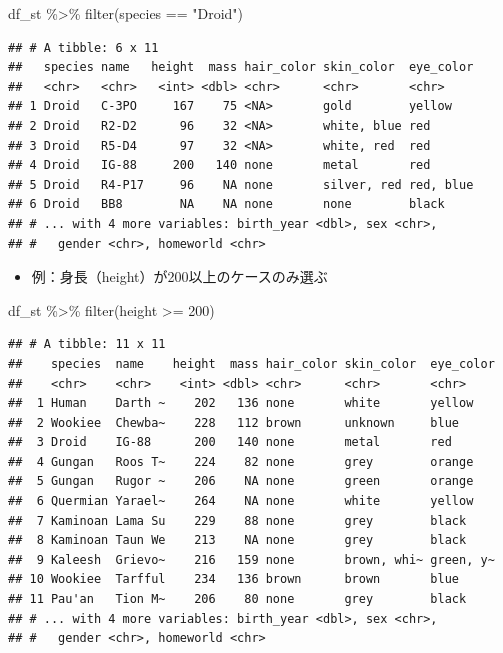 \documentclass[
  xelatex,ja=standard, b5paper]{bxjsbook}
\newenvironment{Shaded}{\begin{snugshade}}{\end{snugshade}}
\newcommand{\DecValTok}[1]{\textcolor[rgb]{0.00,0.00,0.81}{#1}}
\newcommand{\FunctionTok}[1]{\textcolor[rgb]{0.00,0.00,0.00}{#1}}
\newcommand{\NormalTok}[1]{#1}
\newcommand{\SpecialCharTok}[1]{\textcolor[rgb]{0.00,0.00,0.00}{#1}}
\newcommand{\StringTok}[1]{\textcolor[rgb]{0.31,0.60,0.02}{#1}}
\providecommand{\tightlist}{%
  \setlength{\itemsep}{0pt}\setlength{\parskip}{0pt}}
\begin{document}
\begin{Shaded}
\begin{Highlighting}[]
\NormalTok{df\_st }\SpecialCharTok{\%\textgreater{}\%} 
  \FunctionTok{filter}\NormalTok{(species }\SpecialCharTok{==} \StringTok{"Droid"}\NormalTok{)}
\end{Highlighting}
\end{Shaded}

\begin{verbatim}
## # A tibble: 6 x 11
##   species name   height  mass hair_color skin_color  eye_color
##   <chr>   <chr>   <int> <dbl> <chr>      <chr>       <chr>    
## 1 Droid   C-3PO     167    75 <NA>       gold        yellow   
## 2 Droid   R2-D2      96    32 <NA>       white, blue red      
## 3 Droid   R5-D4      97    32 <NA>       white, red  red      
## 4 Droid   IG-88     200   140 none       metal       red      
## 5 Droid   R4-P17     96    NA none       silver, red red, blue
## 6 Droid   BB8        NA    NA none       none        black    
## # ... with 4 more variables: birth_year <dbl>, sex <chr>,
## #   gender <chr>, homeworld <chr>
\end{verbatim}

\begin{itemize}
\tightlist
\item
  例：身長（height）が200以上のケースのみ選ぶ
\end{itemize}

\begin{Shaded}
\begin{Highlighting}[]
\NormalTok{df\_st }\SpecialCharTok{\%\textgreater{}\%} 
  \FunctionTok{filter}\NormalTok{(height }\SpecialCharTok{\textgreater{}=} \DecValTok{200}\NormalTok{)}
\end{Highlighting}
\end{Shaded}

\begin{verbatim}
## # A tibble: 11 x 11
##    species  name    height  mass hair_color skin_color  eye_color
##    <chr>    <chr>    <int> <dbl> <chr>      <chr>       <chr>    
##  1 Human    Darth ~    202   136 none       white       yellow   
##  2 Wookiee  Chewba~    228   112 brown      unknown     blue     
##  3 Droid    IG-88      200   140 none       metal       red      
##  4 Gungan   Roos T~    224    82 none       grey        orange   
##  5 Gungan   Rugor ~    206    NA none       green       orange   
##  6 Quermian Yarael~    264    NA none       white       yellow   
##  7 Kaminoan Lama Su    229    88 none       grey        black    
##  8 Kaminoan Taun We    213    NA none       grey        black    
##  9 Kaleesh  Grievo~    216   159 none       brown, whi~ green, y~
## 10 Wookiee  Tarfful    234   136 brown      brown       blue     
## 11 Pau'an   Tion M~    206    80 none       grey        black    
## # ... with 4 more variables: birth_year <dbl>, sex <chr>,
## #   gender <chr>, homeworld <chr>
\end{verbatim}
\end{document}
